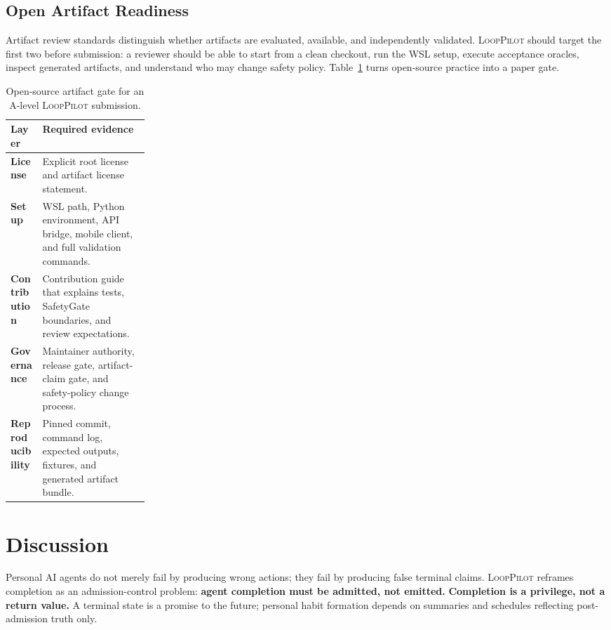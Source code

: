 \documentclass[11pt]{article}
\newcommand{\looppilot}{\textsc{LoopPilot}}
\begin{document}
\subsection{Open Artifact Readiness}
\label{sec:open-artifact}

Artifact review standards distinguish whether artifacts are evaluated, available, and independently validated.
\looppilot{} should target the first two before submission: a reviewer should be able to start from a clean checkout, run the WSL setup, execute acceptance oracles, inspect generated artifacts, and understand who may change safety policy.
Table~\ref{tab:open-artifact-gate} turns open-source practice into a paper gate.

\begin{table}[t]
  \centering
  \caption{Open-source artifact gate for an A-level \looppilot{} submission.}
  \label{tab:open-artifact-gate}
  \small
  \begin{tabularx}{\linewidth}{@{}>{\bfseries}p{0.23\linewidth} X@{}}
    \toprule
    Layer & Required evidence \\
    \midrule
    License & Explicit root license and artifact license statement. \\
    Setup & WSL path, Python environment, API bridge, mobile client, and full validation commands. \\
    Contribution & Contribution guide that explains tests, SafetyGate boundaries, and review expectations. \\
    Governance & Maintainer authority, release gate, artifact-claim gate, and safety-policy change process. \\
    Reproducibility & Pinned commit, command log, expected outputs, fixtures, and generated artifact bundle. \\
    \bottomrule
  \end{tabularx}
\end{table}

\section{Discussion}
\label{sec:discussion}

Personal AI agents do not merely fail by producing wrong actions; they fail by producing false terminal claims.
\looppilot{} reframes completion as an admission-control problem: \textbf{agent completion must be admitted, not emitted.}
\textbf{Completion is a privilege, not a return value.}
A terminal state is a promise to the future; personal habit formation depends on summaries and schedules reflecting post-admission truth only.
\end{document}
